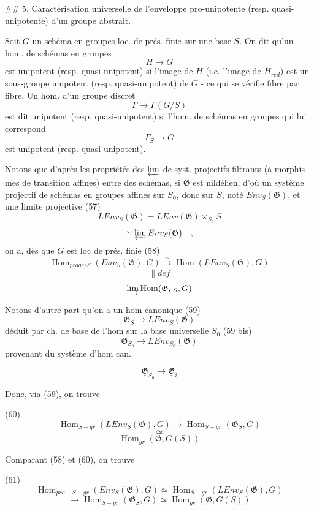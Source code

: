 \newpage


## 5. Caractérisation universelle de l'enveloppe pro-unipotente (resp. quasi-unipotente) d'un groupe abstrait.

Soit $G$ un schéma en groupes loc. de prés. finie sur une base $S$.
On dit qu'un hom. de schémas en groupes
$$H \to G$$
est unipotent (resp. quasi-unipotent) si l'image de $H$ (i.e. l'image de $H_{red}$) est un sous-groupe unipotent (resp. quasi-unipotent) de $G$ - ce qui se vérifie fibre par fibre. Un hom. d'un groupe discret
$$\Gamma \to \Gamma(G/S)$$
est dit unipotent (resp. quasi-unipotent) si l'hom. de schémas en groupes qui lui correspond
$$\Gamma_S \to G$$
est unipotent (resp. quasi-unipotent).

\newpage


Notons que d'après les propriétés des
$\varprojlim$ de syst. projectifs filtrants (à morphis-
mes de transition affines) entre des
schémas, si $\mathfrak{G}$ est nildélien,
d'où un système projectif de
schémas en groupes affines sur $S_0$, donc
sur $S$, noté $Env_S(\mathfrak{G})$, et une
limite projective
(57) $$LEnv_S(\mathfrak{G}) = LEnv(\mathfrak{G}) \times_{S_0} S$$
$$\simeq \varprojlim Env_S(\mathfrak{G}) \quad ,$$
on a, dès que $G$ est loc de
prés. finie
(58) $$\operatorname{Hom}_{progr/S}(Env_S(\mathfrak{G}), G) \xrightarrow{\sim} \operatorname{Hom}(LEnv_S(\mathfrak{G}), G)$$
$$\parallel def$$
$$\varinjlim \operatorname{Hom}(\mathfrak{G}_{i,S}, G)$$

Notons d'autre part qu'on a un
hom canonique
(59) $$\mathfrak{G}_S \to LEnv_S(\mathfrak{G})$$
déduit par ch. de base de l'hom
sur la base universelle $S_0$
(59 bis) $$\mathfrak{G}_{S_0} \to LEnv_{S_0}(\mathfrak{G})$$
provenant du système d'hom can.

\newpage


$$ \underline{\mathfrak{G}}_{S_0} \longrightarrow \underline{\mathfrak{G}}_i $$

Donc, via (59), on trouve

(60) $$ \operatorname{Hom}_{S-gr}(L Env_S(\mathfrak{G}), G) \longrightarrow \operatorname{Hom}_{S-gr}(\mathfrak{G}_S, G) $$
$$ \simeq $$
$$ \operatorname{Hom}_{gr}(\mathfrak{G}, G(S)) $$

Comparant (58) et (60), on trouve

(61) $$ \operatorname{Hom}_{pro-S-gr}(Env_S(\mathfrak{G}), G) \simeq \operatorname{Hom}_{S-gr}(L Env_S(\mathfrak{G}), G) $$
$$ \longrightarrow \operatorname{Hom}_{S-gr}(\mathfrak{G}_S, G) \simeq \operatorname{Hom}_{gr}(\mathfrak{G}, G(S)) $$

